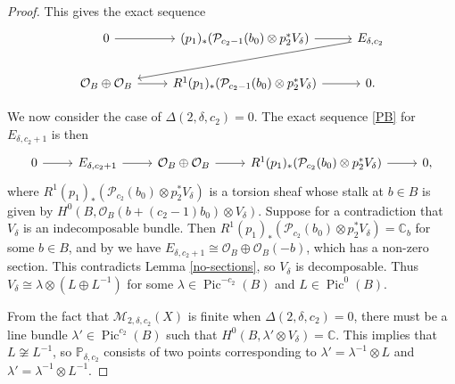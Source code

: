 \documentclass{article}[12pt]
\theoremstyle{definition}
\theoremstyle{remark}
\newcommand \C{\mathbb C}
\numberwithin{equation}{section}
\newcommand \mc{\mathcal}
\newcommand \mb{\mathbb}
\DeclareMathOperator{\Pic}{Pic}
\begin{document}
\begin{proof}
    This gives the exact sequence \begin{equation}\label{PB}
        \begin{tikzcd}
            0 \arrow[r] & (p_1)_*(\mc{P}_{c_2-1}(b_0)\otimes p_2^*V_\delta) \arrow[r] & E_{\delta,c_2} \arrow[lld] \\
             \mc{O}_B\oplus \mc{O}_B \arrow[r] & R^1(p_1)_*(\mc{P}_{c_2-1}(b_0)\otimes p_2^*V_\delta) \arrow[r] & 0.
        \end{tikzcd}
    \end{equation}
    
    We now consider the case of $\Delta(2,\delta,c_2)=0$. The exact sequence \eqref{PB} for $E_{\delta,c_2+1}$ is then
    $$\begin{tikzcd} 0 \arrow[r] & E_{\delta,c_2+1} \arrow[r] & \mc{O}_B\oplus \mc{O}_B \arrow[r] & R^1(p_1)_*(\mc{P}_{c_2}(b_0)\otimes p_2^*V_\delta) \arrow[r] & 0,
    \end{tikzcd}$$
    where $R^1(p_1)_*(\mc{P}_{c_2}(b_0)\otimes p_2^*V_\delta)$ is a torsion sheaf whose stalk at $b \in B$ is given by $H^0(B, \mc{O}_B(b+(c_2-1)b_0)\otimes V_\delta)$. Suppose for a contradiction that $V_\delta$ is an indecomposable bundle. Then $R^1(p_1)_*(\mc{P}_{c_2}(b_0)\otimes p_2^*V_\delta)=\C_b$ for some $b \in B$, and by \cite{Boozer} we have $E_{\delta,c_2+1}\cong \mc{O}_B\oplus \mc{O}_B(-b)$, which has a non-zero section. This contradicts Lemma \ref{no-sections}, so $V_\delta$ is decomposable. Thus $V_\delta\cong \lambda\otimes (L\oplus L^{-1})$ for some $\lambda \in \Pic^{-c_2}(B)$ and $L\in \Pic^0(B)$.
    
    From the fact that $\mc{M}_{2,\delta,c_2}(X)$ is finite when $\Delta(2,\delta,c_2)=0$, there must be a line bundle $\lambda' \in \Pic^{c_2}(B)$ such that $H^0(B,\lambda'\otimes V_\delta)=\C.$
    This implies that $L\not\cong L^{-1}$, so $\mb{P}_{\delta,c_2}$ consists of two points corresponding to $\lambda'=\lambda^{-1}\otimes L$ and $\lambda'=\lambda^{-1}\otimes L^{-1}$.
    
   
    

\end{proof}
\end{document}
